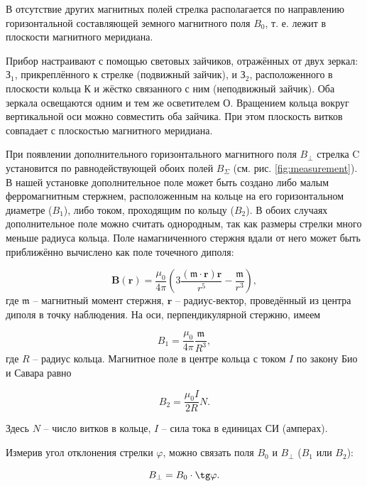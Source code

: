 \documentclass[a4paper,12pt]{article} %
\begin{document}
В отсутствие других магнитных полей стрелка располагается по направлению горизонтальной составляющей земного магнитного поля $B_0$, т. е. лежит в плоскости магнитного меридиана.

Прибор настраивают с помощью световых зайчиков, отражённых от двух зеркал: З$_1$, прикреплённого к стрелке (подвижный зайчик), и З$_2$, расположенного в плоскости кольца К и жёстко связанного с ним (неподвижный зайчик). Оба зеркала освещаются одним и тем же осветителем О. Вращением кольца вокруг вертикальной оси можно совместить оба зайчика. При этом плоскость витков совпадает с плоскостью магнитного меридиана.

При появлении дополнительного горизонтального магнитного поля $B_\perp$ стрелка C установится по равнодействующей обоих полей $B_\Sigma$ (см. рис. \ref{fig:measurement}). В нашей установке дополнительное поле может быть создано либо малым ферромагнитным стержнем, расположенным на кольце на его горизонтальном диаметре ($B_1$), либо током, проходящим по кольцу ($B_2$). В обоих случаях дополнительное поле можно считать однородным, так как размеры стрелки много меньше радиуса кольца. Поле намагниченного стержня вдали от него может быть приближённо вычислено как поле точечного диполя:

\begin{equation}
    \mathbf{B(r)} = \frac{\mu_0}{4\pi}\left(3\frac{(\mathbf{\mathfrak{m} \cdot r})\mathbf{r}}{r^5} - \frac{\mathbf{\mathfrak{m}}}{r^3}\right),
\label{dipoleField}
\end{equation}
где $\mathbf{\mathfrak{m}}$ -- магнитный момент стержня, $\mathbf{r}$ -- радиус-вектор, проведённый из центра диполя в точку наблюдения. На оси, перпендикулярной стержню, имеем

\begin{equation}
    B_1 = \frac{\mu_0}{4\pi}\frac{\mathfrak{m}}{R^3},
\label{perpField}
\end{equation}
где $R$ -- радиус кольца. Магнитное поле в центре кольца с током $I$ по закону Био и Савара равно

\begin{equation}
    B_2 = \frac{\mu_0I}{2R}N.
\label{BiotSavart}
\end{equation}

Здесь $N$ -- число витков в кольце, $I$ -- сила тока в единицах СИ (амперах).

Измерив угол отклонения стрелки $\varphi$, можно связать поля $B_0$ и $B_\perp$ ($B_1$ или $B_2$):

\begin{equation}
    B_\perp = B_0 \cdot \tg\varphi.
\label{angle}
\end{equation}
\end{document}
